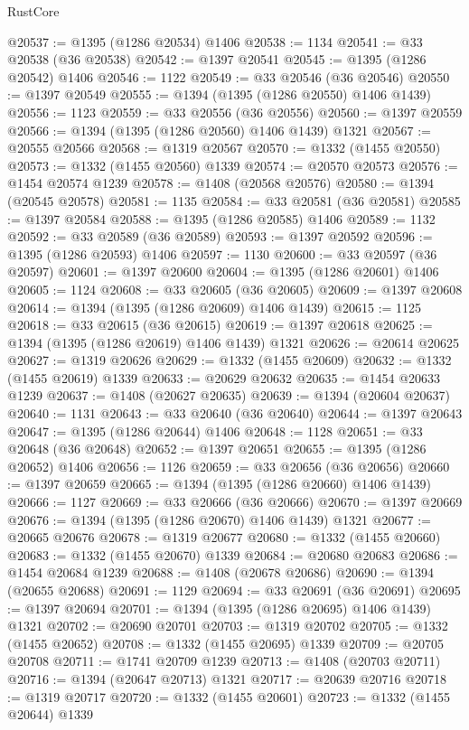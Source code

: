 \begin{lexlean}{RustCore}
\begin{coremodule}
@20537 := @1395 (@1286 @20534) @1406
@20538 := 1134
@20541 := @33 @20538 (@36 @20538)
@20542 := @1397 @20541
@20545 := @1395 (@1286 @20542) @1406
@20546 := 1122
@20549 := @33 @20546 (@36 @20546)
@20550 := @1397 @20549
@20555 := @1394 (@1395 (@1286 @20550) @1406 @1439)
@20556 := 1123
@20559 := @33 @20556 (@36 @20556)
@20560 := @1397 @20559
@20566 := @1394 (@1395 (@1286 @20560) @1406 @1439) @1321
@20567 := @20555 @20566
@20568 := @1319 @20567
@20570 := @1332 (@1455 @20550)
@20573 := @1332 (@1455 @20560) @1339
@20574 := @20570 @20573
@20576 := @1454 @20574 @1239
@20578 := @1408 (@20568 @20576)
@20580 := @1394 (@20545 @20578)
@20581 := 1135
@20584 := @33 @20581 (@36 @20581)
@20585 := @1397 @20584
@20588 := @1395 (@1286 @20585) @1406
@20589 := 1132
@20592 := @33 @20589 (@36 @20589)
@20593 := @1397 @20592
@20596 := @1395 (@1286 @20593) @1406
@20597 := 1130
@20600 := @33 @20597 (@36 @20597)
@20601 := @1397 @20600
@20604 := @1395 (@1286 @20601) @1406
@20605 := 1124
@20608 := @33 @20605 (@36 @20605)
@20609 := @1397 @20608
@20614 := @1394 (@1395 (@1286 @20609) @1406 @1439)
@20615 := 1125
@20618 := @33 @20615 (@36 @20615)
@20619 := @1397 @20618
@20625 := @1394 (@1395 (@1286 @20619) @1406 @1439) @1321
@20626 := @20614 @20625
@20627 := @1319 @20626
@20629 := @1332 (@1455 @20609)
@20632 := @1332 (@1455 @20619) @1339
@20633 := @20629 @20632
@20635 := @1454 @20633 @1239
@20637 := @1408 (@20627 @20635)
@20639 := @1394 (@20604 @20637)
@20640 := 1131
@20643 := @33 @20640 (@36 @20640)
@20644 := @1397 @20643
@20647 := @1395 (@1286 @20644) @1406
@20648 := 1128
@20651 := @33 @20648 (@36 @20648)
@20652 := @1397 @20651
@20655 := @1395 (@1286 @20652) @1406
@20656 := 1126
@20659 := @33 @20656 (@36 @20656)
@20660 := @1397 @20659
@20665 := @1394 (@1395 (@1286 @20660) @1406 @1439)
@20666 := 1127
@20669 := @33 @20666 (@36 @20666)
@20670 := @1397 @20669
@20676 := @1394 (@1395 (@1286 @20670) @1406 @1439) @1321
@20677 := @20665 @20676
@20678 := @1319 @20677
@20680 := @1332 (@1455 @20660)
@20683 := @1332 (@1455 @20670) @1339
@20684 := @20680 @20683
@20686 := @1454 @20684 @1239
@20688 := @1408 (@20678 @20686)
@20690 := @1394 (@20655 @20688)
@20691 := 1129
@20694 := @33 @20691 (@36 @20691)
@20695 := @1397 @20694
@20701 := @1394 (@1395 (@1286 @20695) @1406 @1439) @1321
@20702 := @20690 @20701
@20703 := @1319 @20702
@20705 := @1332 (@1455 @20652)
@20708 := @1332 (@1455 @20695) @1339
@20709 := @20705 @20708
@20711 := @1741 @20709 @1239
@20713 := @1408 (@20703 @20711)
@20716 := @1394 (@20647 @20713) @1321
@20717 := @20639 @20716
@20718 := @1319 @20717
@20720 := @1332 (@1455 @20601)
@20723 := @1332 (@1455 @20644) @1339

\end{coremodule}
\end{lexlean}
